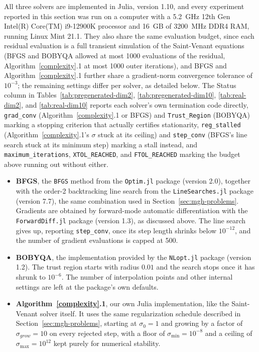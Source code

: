 \documentclass{article}
\begin{document}
All three solvers are implemented in Julia, version 1.10, and every
experiment reported in this section was run on a computer with a
5.2~GHz 12th Gen Intel(R) Core(TM) i9-12900K processor and 16~GB of
3200~MHz DDR4 RAM, running Linux Mint 21.1. They also share the same
evaluation budget, since each residual evaluation is a full transient
simulation of the Saint-Venant equations (BFGS and BOBYQA allowed at
most 1000 evaluations of the residual, Algorithm~\ref{complexity}.1 at
most 1000 outer iterations), and BFGS and Algorithm~\ref{complexity}.1
further share a gradient-norm convergence tolerance of $10^{-3}$; the
remaining settings differ per solver, as detailed below. The Status
column in Tables~\ref{tab:pregenerated-dim2}, \ref{tab:pregenerated-dim10},
\ref{tab:real-dim2}, and \ref{tab:real-dim10} reports each solver's own
termination code directly, \texttt{grad\_conv} (Algorithm~\ref{complexity}.1
or BFGS) and \texttt{Trust\_Region} (BOBYQA) marking a stopping
criterion that actually certifies stationarity, \texttt{reg\_stalled}
(Algorithm~\ref{complexity}.1's $\sigma$ stuck at its ceiling) and
\texttt{step\_conv} (BFGS's line search stuck at its minimum step)
marking a stall instead, and \texttt{maximum\_iterations},
\texttt{XTOL\_REACHED}, and \texttt{FTOL\_REACHED} marking the budget
above running out without either.

\begin{itemize}
	\item \textbf{BFGS}, the \texttt{BFGS} method from the
	\texttt{Optim.jl} package (version 2.0), together with the order-2
	backtracking line search from the \texttt{LineSearches.jl} package
	(version 7.7), the same combination used in
	Section~\ref{sec:mgh-problems}. Gradients are obtained by
	forward-mode automatic differentiation with the
	\texttt{ForwardDiff.jl} package (version 1.3), as discussed above.
	The line search gives up, reporting \texttt{step\_conv}, once its
	step length shrinks below $10^{-12}$, and the number of gradient
	evaluations is capped at 500.
	\item \textbf{BOBYQA}, the implementation provided by the
	\texttt{NLopt.jl} package (version 1.2). The trust region starts
	with radius $0.01$ and the search stops once it has shrunk to
	$10^{-6}$. The number of interpolation points and other internal
	settings are left at the package's own defaults.
	\item \textbf{Algorithm~\ref{complexity}.1}, our own Julia
	implementation, like the Saint-Venant solver itself. It uses the
	same regularization schedule described in Section~\ref{sec:mgh-problems},
	starting at $\sigma_0=1$ and growing by a factor of
	$\sigma_{grow}=10$ on every rejected step, with a floor of
	$\sigma_{\min}=10^{-8}$ and a ceiling of $\sigma_{\max}=10^{12}$
	kept purely for numerical stability.
\end{itemize}
\end{document}
